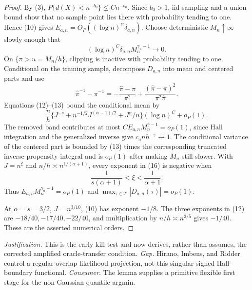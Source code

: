 \documentclass{article}
\begin{document}
\begin{proof}
By (3), \(P\{d(X)<n^{-b_0}\}\le Cn^{-b_0}\).  Since \(b_0>1\), iid sampling and a union bound show that no sample point lies there with probability tending to one.  Hence (10) gives
\(E_{a,n}=O_P((\log n)^C\delta_{a,n})\).  Choose deterministic \(M_n\uparrow\infty\) slowly enough that
\[
 (\log n)^C\delta_{a,n}M_n^{\gamma_a-1}\to0.
\tag{14}
\]
On \(\{\pi>u=M_n/h\}\), clipping is inactive with probability tending to one.  Conditional on the training sample, decompose \(D_{a,n}\) into mean and centered parts and use
\[
 \widehat\pi^{-1}-\pi^{-1}
 =-\frac{\widehat\pi-\pi}{\pi^2}
 +\frac{(\widehat\pi-\pi)^2}{\pi^2\widehat\pi}.
\tag{15}
\]
Equations (12)--(13) bound the conditional mean by
\[
 \frac n h\{J^{-s}+n^{-1/2}J^{(\alpha-1)/2}+J^\alpha/n\}(\log n)^C+o_P(1).
\tag{16}
\]
The removed band contributes at most
\(CE_{a,n}M_n^{\gamma-1}=o_P(1)\), since Hall integration and the generalized inverse give \(c_an h^{-\gamma}\to1\).  The conditional variance of the centered part is bounded by (13) times the corresponding truncated inverse-propensity integral and is \(o_P(1)\) after making \(M_n\) still slower.  With \(J=n^\xi\) and \(n/h\asymp n^{1/(\alpha+1)}\), every exponent in (16) is negative when
\[
 \frac1{s(\alpha+1)}<\xi<\frac1{\alpha+1}.
\]
Thus \(E_{a,n}M_n^{\gamma_a-1}=o_P(1)\) and
\(\max_{\tau\in\mathcal T}|D_{a,n}(\tau)|=o_P(1)\).

At \(\alpha=s=3/2\), \(J=n^{3/10}\), (10) has exponent \(-1/8\).  The three exponents in (12) are \(-18/40,-17/40,-22/40\), and multiplication by \(n/h\asymp n^{2/5}\) gives \(-1/40\).  These are the asserted numerical orders.
\end{proof}
\par\smallskip\noindent \textit{Justification.} This is the early kill test and now derives, rather than assumes, the corrected amplified oracle-transfer condition. \textit{Gap.} Hirano, Imbens, and Ridder control a regular-overlap likelihood projection, not this singular signed Hall-boundary functional. \textit{Consumer.} The lemma supplies a primitive flexible first stage for the non-Gaussian quantile argmin.
\end{document}
